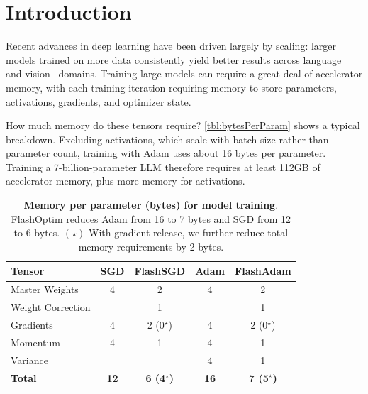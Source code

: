 \documentclass[10pt,twocolumn,letterpaper]{article}
\theoremstyle{plain}
\theoremstyle{definition}
\theoremstyle{remark}
\newcommand{\flashOptim}{FlashOptim\xspace}
\newcommand{\flashSGD}{FlashSGD\xspace}
\begin{document}
\section{Introduction} \label{sec:intro}

Recent advances in deep learning have been driven largely by scaling: larger models trained on more data consistently yield better results across language~\citep{kaplan2020scaling,hoffmann2022training,chowdhery2023palm} and vision~\citep{rosenfeld2019constructive,tan2019efficientnet,dehghani2023scalingvit} domains.
Training large models can require a great deal of accelerator memory, with each training iteration requiring memory to store parameters, activations, gradients, and optimizer state.

How much memory do these tensors require? \autoref{tbl:bytesPerParam} shows a typical breakdown. Excluding activations, which scale with batch size rather than parameter count, training with Adam uses about 16 bytes per parameter. Training a 7-billion-parameter LLM therefore requires at least 112GB of accelerator memory, plus more memory for activations.

\begin{table}[t]
    \centering
    \caption{\textbf{Memory per parameter (bytes) for model training}. 
    \flashOptim reduces Adam from 16 to 7 bytes and SGD from 12 to 6 bytes.
     $(\star)$ With gradient release, we further reduce total memory requirements by 2 bytes.}
    \label{tbl:bytesPerParam}
    \setlength{\tabcolsep}{3pt}

    \small
    \renewcommand{\arraystretch}{1.2}
    \begin{tabular}{lcccc}
        \toprule
        \textbf{Tensor} & \textbf{SGD} & \textbf{\flashSGD} & \textbf{Adam} & \textbf{FlashAdam} \\
        \midrule
        Master Weights      & 4 & 2\phantom{ (0${}^\star$)} & 4 & 2\phantom{ (0${}^\star$)} \\
        Weight Correction   &   & 1\phantom{ (0${}^\star$)} &   & 1\phantom{ (0${}^\star$)} \\
        Gradients           & 4 & 2 (0${}^\star$) & 4 & 2 (0${}^\star$) \\
        Momentum            & 4 & 1\phantom{ (0${}^\star$)} & 4 & 1\phantom{ (0${}^\star$)} \\
        Variance            &   &   & 4 & 1\phantom{ (0${}^\star$)} \\
        \midrule
        \textbf{Total} & \textbf{12} & \textbf{6 (4${}^\star$)} & \textbf{16} & \textbf{7 (5${}^\star$)} \\
        \bottomrule
    \end{tabular}
\end{table}
\end{document}
